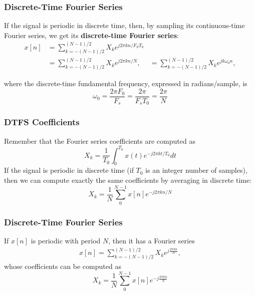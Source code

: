 \documentclass{beamer}
\begin{document}
\begin{frame}
  \frametitle{Discrete-Time Fourier Series}
  
  If the signal is periodic in discrete time, then, by sampling its
  continuous-time Fourier series, we get its {\bf discrete-time
    Fourier series}:
  \begin{align*}
    x[n] &= \sum_{k=-(N-1)/2}^{(N-1)/2} X_k e^{j2\pi k n/F_ST_0}\\
    &= \sum_{k=-(N-1)/2}^{(N-1)/2} X_k e^{j2\pi k n/N},
    &= \sum_{k=-(N-1)/2}^{(N-1)/2} X_k e^{jk \omega_0 n},
  \end{align*}
  
  where the discrete-time fundamental frequency, expressed in radians/sample, is
  \begin{displaymath}
    \omega_0 = \frac{2\pi F_0}{F_s} = \frac{2\pi}{F_sT_0} = \frac{2\pi}{N}
  \end{displaymath}
\end{frame}

\begin{frame}
  \frametitle{DTFS Coefficients}
  
  Remember that the Fourier series coefficients are computed as
  \begin{displaymath}
    X_k = \frac{1}{T_0}\int_0^{T_0}x(t)e^{-j2\pi kt/T_0}dt
  \end{displaymath}
  If the signal is periodic in discrete time (if $T_0$ is an integer
  number of samples), then we can compute exactly the same
  coefficients by averaging in discrete time:
  \begin{displaymath}
    X_k = \frac{1}{N}\sum_0^{N-1}x[n]e^{-j2\pi kn/N}
  \end{displaymath}
\end{frame}

\begin{frame}
  \frametitle{Discrete-Time Fourier Series}

  If $x[n]$ is periodic with period $N$, then it has a Fourier series
  \begin{align*}
    x[n] = \sum_{k=-(N-1)/2}^{(N-1)/2} X_k e^{j\frac{2\pi k n}{N}},
  \end{align*}
  whose coefficients can be computed as
  \begin{displaymath}
    X_k = \frac{1}{N}\sum_0^{N-1}x[n]e^{-j\frac{2\pi kn}{N}}
  \end{displaymath}
\end{frame}

\end{document}
